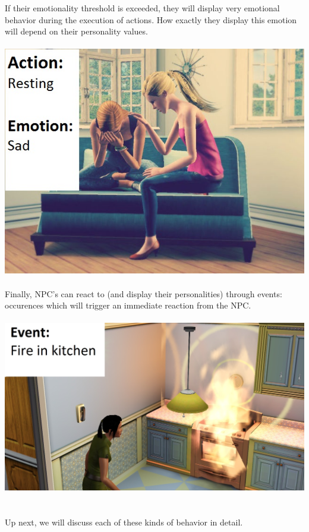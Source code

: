 \documentclass[11pt]{article} %
\begin{document}
\newpage
If their emotionality threshold is exceeded, they will display very emotional behavior during the execution of actions. How exactly they display this emotion will depend on their personality values.
~\\

~\\
\includegraphics[scale=0.4]{SimsCrying}
~\\

Finally, NPC's can react to (and display their personalities) through events: occurences which will trigger an immediate reaction from the NPC.
~\\

~\\
\includegraphics[scale=0.4]{SimsFire}
~\\

~\\
Up next, we will discuss each of these kinds of behavior in detail.
\end{document}

